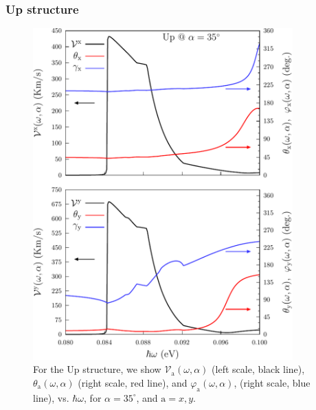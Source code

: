 \documentclass[floatfix,prb,aps,superscriptaddress,showpacs,11pt,preprint,letterpaper]{revtex4}
\def\tama{10cm}
\begin{document}
\subsubsection{Up structure}

\begin{figure}[t]
\centering
\includegraphics[width=\tama]{upplots/up-vx-vy-w1}
\caption{For the Up structure, we show
$\mathcal{V}_{\mathrm{a}} (\omega,\alpha)$ (left scale, black line),
$\theta_{\mathrm{a}} (\omega,\alpha)$ (right scale, red line), and
$\varphi_{\mathrm{a}} (\omega,\alpha)$, (right scale, blue line), vs.
$\hbar\omega$, for $\alpha=35^\circ$, and $\mathrm{a}=x,y$. }
\label{fig:up-vab-comp-rtp-1}
\end{figure}
\end{document}
